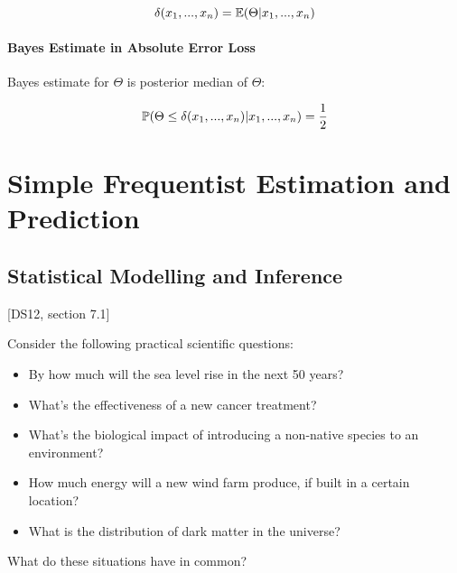 \documentclass[a4paper]{article}
\begin{document}
                \[
                    \delta(x_1, ..., x_n) = \mathbb{E}(\Theta | x_1, ..., x_n)
                \]

            \paragraph{Bayes Estimate in Absolute Error Loss}
                Bayes estimate for $\Theta$ is posterior median of $\Theta$:

                \[
                    \mathbb{P}(\Theta \leq \delta(x_1, ..., x_n) | x_1, ..., x_n) =
                    \frac{1}{2}
                \]

    \newpage
    \section{Simple Frequentist Estimation and Prediction}
        \subsection{Statistical Modelling and Inference}
            \begin{fread}
                [MR03, section 7.1]

                [DS12, section 7.1]
            \end{fread}

            Consider the following practical scientific questions:

            \begin{itemize}
                \item By how much will the sea level rise in the next 50 years?
                \item What's the effectiveness of a new cancer treatment?
                \item What's the biological impact of introducing a non-native
                    species to an environment?
                \item How much energy will a new wind farm produce, if built in
                    a certain location?
                \item What is the distribution of dark matter in the universe?
            \end{itemize}

            What do these situations have in common?
\end{document}
